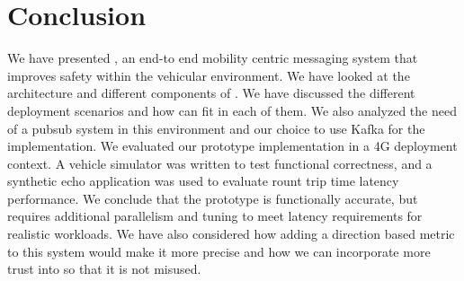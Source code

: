 \section{Conclusion}

We have presented \name, an end-to end mobility centric messaging
system that improves safety within the vehicular environment. We have
looked at the architecture and different components of \name. We
have discussed the different deployment scenarios and how \name{} can
fit in each of them. We also analyzed the need of a pubsub system in
this environment and our choice to use Kafka for the
implementation. We evaluated our prototype \name{} implementation in a
4G deployment context. A vehicle simulator was written to test
functional correctness, and a synthetic echo application was used to
evaluate rount trip time latency performance. We conclude that the
prototype is functionally accurate, but requires additional
parallelism and tuning to meet latency requirements for realistic
workloads. We have also considered how adding a direction based metric
to this system would make it more precise and how we can incorporate
more trust into \name{} so that it is not misused.
